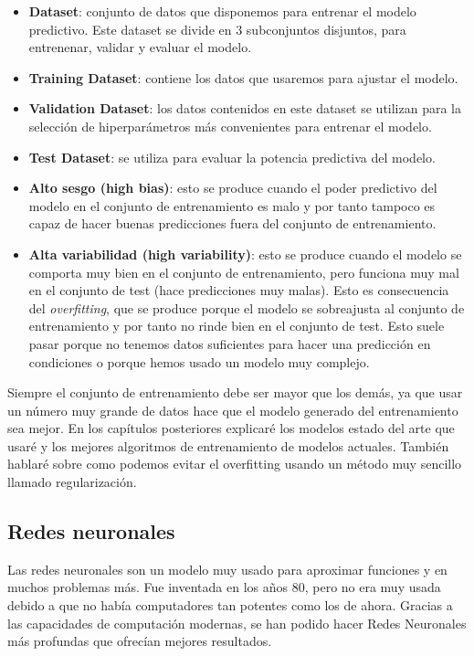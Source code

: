 \begin{itemize}
	\item \textbf{Dataset}: conjunto de datos que disponemos para entrenar el modelo predictivo. Este dataset se divide en 3 subconjuntos disjuntos, para entrenenar, validar y evaluar el modelo.
	\item \textbf{Training Dataset}: contiene los datos que usaremos para ajustar el modelo.
	\item \textbf{Validation Dataset}: los datos contenidos en este dataset se utilizan para la selección de hiperparámetros más convenientes para entrenar el modelo.
	\item \textbf{Test Dataset}: se utiliza para evaluar la potencia predictiva del modelo.
	\item \textbf{Alto sesgo (high bias)}: esto se produce cuando el poder predictivo del modelo en el conjunto de entrenamiento es malo y por tanto tampoco es capaz de hacer buenas predicciones fuera del conjunto de entrenamiento.
	\item \textbf{Alta variabilidad (high variability)}: esto se produce cuando el modelo se comporta muy bien en el conjunto de entrenamiento, pero funciona muy mal en el conjunto de test (hace predicciones muy malas). Esto es consecuencia del \textit{overfitting}, que se produce porque el modelo se sobreajusta al conjunto de entrenamiento y por tanto no rinde bien en el conjunto de test. Esto suele pasar porque no tenemos datos suficientes para hacer una predicción en condiciones o porque hemos usado un modelo muy complejo.
\end{itemize}

Siempre el conjunto de entrenamiento debe ser mayor que los demás, ya que usar un número muy grande de datos hace que el modelo generado del entrenamiento sea mejor. En los capítulos posteriores explicaré los modelos estado del arte que usaré y los mejores algoritmos de entrenamiento de modelos actuales. También hablaré sobre como podemos evitar el overfitting usando un método muy sencillo llamado regularización.

\subsection{Redes neuronales}

Las redes neuronales son un modelo muy usado para aproximar funciones y en muchos problemas más. Fue inventada en los años 80, pero no era muy usada debido a que no había computadores tan potentes como los de ahora. Gracias a las capacidades de computación modernas, se han podido hacer Redes Neuronales más profundas que ofrecían mejores resultados.\newline

